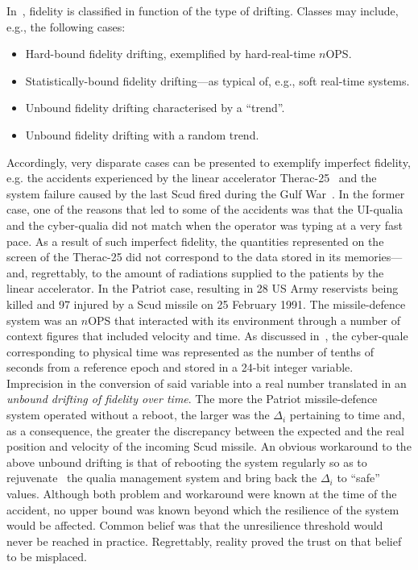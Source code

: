 \documentclass{article}
\begin{document}
In~\cite{DF14a}, fidelity is classified in function of the type of drifting. Classes may include, e.g., the following cases:

\begin{itemize}
\item Hard-bound fidelity drifting, exemplified by hard-real-time $n$OPS.
\item Statistically-bound fidelity drifting---as typical of, e.g., soft real-time systems.
\item Unbound fidelity drifting characterised by a ``trend''.
\item Unbound fidelity drifting with a random trend.
\end{itemize}

Accordingly, very disparate cases can be presented to exemplify imperfect fidelity, e.g. the accidents experienced by the linear accelerator Therac-25~\cite{Therac93,De10} and the system failure caused by the last Scud fired during the Gulf War~\cite{PatriotNYT}. In the former case, one of the reasons that led to some of the accidents was that the UI-qualia and the cyber-qualia did not match when the operator was typing at a very fast pace. As a result of such imperfect fidelity, the quantities represented on the screen of the Therac-25 did not correspond to the data stored in its memories---and, regrettably, to the amount of radiations supplied to the patients by the linear accelerator. In the Patriot case, resulting in 28 US Army reservists being killed and 97 injured by a Scud missile on 25 February 1991. The missile-defence system was an $n$OPS that interacted with its environment through a number of context figures that included velocity and time. As discussed in~\cite{Assets:GrTr07}, the cyber-quale corresponding to physical time was represented as the number of tenths of seconds from a reference epoch and stored in a 24-bit integer variable. Imprecision in the conversion of said variable into a real number translated in an \emph{unbound drifting of fidelity over time}. The more the Patriot missile-defence system operated without a reboot, the larger was the $\Delta_{i}$ pertaining to time and, as a consequence, the greater the discrepancy between the expected and the real position and velocity of the incoming Scud missile.  An obvious workaround to the above unbound drifting is that of rebooting the system regularly so as to rejuvenate~\cite{GRT} the qualia management system and bring back the $\Delta_{i}$ to ``safe'' values. Although both problem and workaround were known at the time of the accident, no upper bound was known beyond which the resilience of the system would be affected. Common belief was that the unresilience threshold would never be reached in practice. Regrettably, reality proved the trust on that belief to be misplaced.
\end{document}

